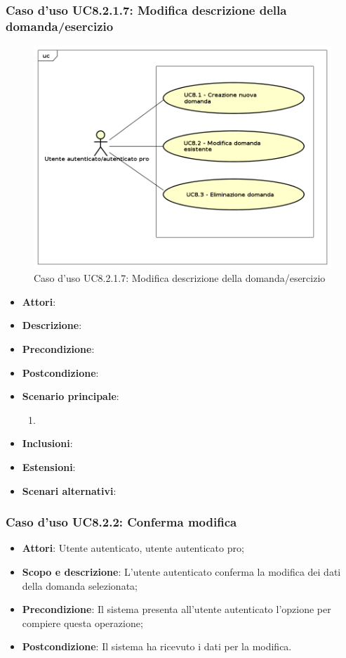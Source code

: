 		\subsubsection{Caso d'uso UC8.2.1.7: Modifica descrizione della domanda/esercizio}
		\label{UC8.2.1.7}
		\begin{figure}[h]
			\centering
			\includegraphics[scale=0.5,keepaspectratio]{UML/UC8.png}
			\caption{Caso d'uso UC8.2.1.7: Modifica descrizione della domanda/esercizio}
		\end{figure}
		\FloatBarrier
		\begin{itemize}
			\item \textbf{Attori}: 
			\item \textbf{Descrizione}:
			\item \textbf{Precondizione}: 
			\item \textbf{Postcondizione}: 
			\item \textbf{Scenario principale}: 
			\begin{enumerate}
				\item
			\end{enumerate}
			\item \textbf{Inclusioni}: 
			\item \textbf{Estensioni}: 
			\item \textbf{Scenari alternativi}: 
		\end{itemize}


	\subsubsection{Caso d'uso UC8.2.2: Conferma modifica}
	\begin{itemize}
		\item
			\textbf{Attori}: Utente autenticato, utente autenticato pro;
		\item
			\textbf{Scopo e descrizione}: L'utente autenticato conferma la modifica dei dati della domanda selezionata;
		\item		
			\textbf{Precondizione}: Il sistema presenta all'utente autenticato l'opzione per compiere questa operazione;
		\item
			\textbf{Postcondizione}: Il sistema ha ricevuto i dati per la modifica.
	\end{itemize}		
